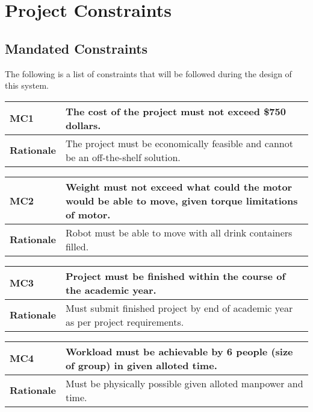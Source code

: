 \documentclass [11pt]{article}
\begin{document}
\section{\textbf{Project Constraints}}

\subsection{Mandated Constraints}
The following is a list of constraints that will be followed during the design of this system.

\begin{longtable}{| p{ } | p{ } | }\hline 
\rowcolor{tableCell}\textbf{MC1} & \textbf{The cost of the project must not exceed \$750 dollars.} \\ \hline
\textbf{Rationale} & The project must be economically feasible and cannot be an off-the-shelf solution.\\ \hline 
\end{longtable}

\begin{longtable}{| p{ } | p{ } | }\hline 
\rowcolor{tableCell}\textbf{MC2}& \textbf{Weight must not exceed what could the motor would be able to move, given torque limitations of motor.}\\ \hline 
\textbf{Rationale} & Robot must be able to move with all drink containers filled.\\ \hline 
\end{longtable}

\begin{longtable}{| p{ } | p{ } | }\hline 
\rowcolor{tableCell}\textbf{MC3} & \textbf{Project must be finished within the course of the academic year.} \\ \hline
\textbf{Rationale} & Must submit finished project by end of academic year as per project requirements.\\ \hline
\end{longtable}

\begin{longtable}{| p{ } | p{ } | }\hline 
\rowcolor{tableCell}\textbf{MC4} & \textbf{Workload must be achievable by 6 people (size of group) in given alloted time.} \\ \hline
\textbf{Rationale} & Must be physically possible given alloted manpower and time.\\ \hline
\end{longtable}
\end{document}
